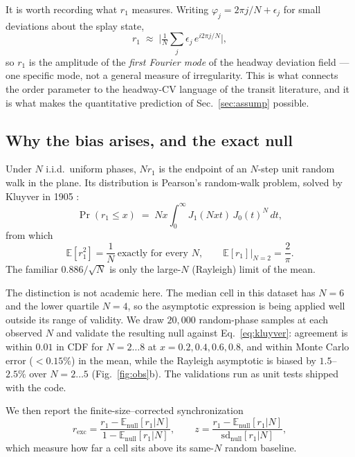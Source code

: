 \documentclass[9pt,twocolumn,twoside]{opticajnl}
\begin{document}
It is worth recording what $r_1$ measures. Writing $\varphi_j = 2\pi j/N + \epsilon_j$ for small
deviations about the splay state,
\begin{equation}
r_1 \;\approx\; \Big|\tfrac{1}{N}\textstyle\sum_j \epsilon_j\, e^{i 2\pi j/N}\Big| ,
\label{eq:mode1}
\end{equation}
so $r_1$ is the amplitude of the \emph{first Fourier mode} of the headway deviation field --- one
specific mode, not a general measure of irregularity. This is what connects the order parameter
to the headway-CV language of the transit literature, and it is what makes the quantitative
prediction of Sec.~\ref{sec:assump} possible.

\subsection{Why the bias arises, and the exact null}\label{sec:null}

Under $N$ i.i.d.\ uniform phases, $N r_1$ is the endpoint of an $N$-step unit random walk in the
plane. Its distribution is Pearson's random-walk problem, solved by Kluyver in 1905
\cite{kluyver05}:
\begin{equation}
\Pr(r_1 \le x) \;=\; N x \int_0^{\infty} J_1(Nxt)\, J_0(t)^{N}\, dt ,
\label{eq:kluyver}
\end{equation}
from which
\begin{equation}
\mathbb{E}[r_1^2] = \frac{1}{N} \ \text{exactly for every } N, \qquad
\mathbb{E}[r_1]\big|_{N=2} = \frac{2}{\pi} .
\label{eq:moments}
\end{equation}
The familiar $0.886/\sqrt{N}$ is only the large-$N$ (Rayleigh) limit of the mean.

The distinction is not academic here. The median cell in this dataset has $N = 6$ and the lower
quartile $N = 4$, so the asymptotic expression is being applied well outside its range of
validity. We draw $20{,}000$ random-phase samples at each observed $N$ and validate the resulting
null against Eq.~\eqref{eq:kluyver}: agreement is within $0.01$ in CDF for $N = 2\ldots8$ at
$x = 0.2, 0.4, 0.6, 0.8$, and within Monte Carlo error ($<0.15\%$) in the mean, while the
Rayleigh asymptotic is biased by $1.5$--$2.5\%$ over $N = 2\ldots5$
(Fig.~\ref{fig:obs}b). The validations run as unit tests shipped with the code.

We then report the finite-size--corrected synchronization
\begin{equation}
r_{\mathrm{exc}} = \frac{r_1 - \mathbb{E}_{\mathrm{null}}[r_1|N]}{1 - \mathbb{E}_{\mathrm{null}}[r_1|N]},
\qquad
z = \frac{r_1 - \mathbb{E}_{\mathrm{null}}[r_1|N]}{\mathrm{sd}_{\mathrm{null}}[r_1|N]} ,
\label{eq:rexc}
\end{equation}
which measure how far a cell sits above its same-$N$ random baseline.
\end{document}
